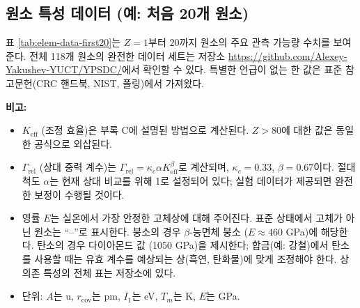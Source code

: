 \documentclass[12pt,a4paper]{article}
\newcommand{\Keff}{K_{\mathrm{eff}}}
\begin{document}
	\subsection{원소 특성 데이터 (예: 처음 20개 원소)}
	
	표 \ref{tab:elem-data-first20}는 \(Z=1\)부터 \(20\)까지 원소의 주요 관측 가능량 수치를 보여준다. 전체 118개 원소의 완전한 데이터 세트는 저장소 \url{https://github.com/Alexey-Yakushev-YUCT/YPSDC/}에서 확인할 수 있다. 특별한 언급이 없는 한 값은 표준 참고문헌(CRC 핸드북, NIST, 폴링)에서 가져왔다.
	
	\textbf{비고:}
	\begin{itemize}
		\item \(\Keff\) (조정 효율)은 부록 C에 설명된 방법으로 계산된다. \(Z>80\)에 대한 값은 동일한 공식으로 외삽된다.
		\item \(\Gamma_{\text{rel}}\) (상대 중력 계수)는 \(\Gamma_{\text{rel}} = \kappa_c \alpha \Keff^{\beta}\)로 계산되며, \(\kappa_c=0.33\), \(\beta=0.67\)이다. 절대 척도 \(\alpha\)는 현재 상대 비교를 위해 1로 설정되어 있다; 실험 데이터가 제공되면 완전한 보정이 수행될 것이다.
		\item 영률 \(E\)는 실온에서 가장 안정한 고체상에 대해 주어진다. 표준 상태에서 고체가 아닌 원소는 “–”로 표시한다. 붕소의 경우 \(\beta\)-능면체 붕소 (\(E \approx 460\) GPa)에 해당한다. 탄소의 경우 다이아몬드 값 (1050 GPa)을 제시한다; 합금(예: 강철)에서 탄소를 사용할 때는 유효 계수를 예상되는 상(흑연, 탄화물)에 맞게 조정해야 한다. 상 의존 특성의 전체 표는 저장소에 있다.
		\item 단위: \(A\)는 u, \(r_{\text{cov}}\)는 pm, \(I_1\)는 eV, \(T_m\)는 K, \(E\)는 GPa.
	\end{itemize}
	
\end{document}
